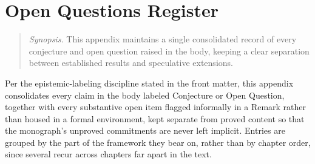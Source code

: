 \chapter{Open Questions Register}
\label{app:open-questions}

\begin{quotation}
\noindent\textit{Synopsis.} This appendix maintains a single consolidated
record of every conjecture and open question raised in the body, keeping a
clear separation between established results and speculative extensions.
\end{quotation}

Per the epistemic-labeling discipline stated in the front matter, this
appendix consolidates every claim in the body labeled Conjecture or Open
Question, together with every substantive open item flagged informally in
a Remark rather than housed in a formal environment, kept separate from
proved content so that the monograph's unproved commitments are never
left implicit. Entries are grouped by the part of the framework they
bear on, rather than by chapter order, since several recur across
chapters far apart in the text.

